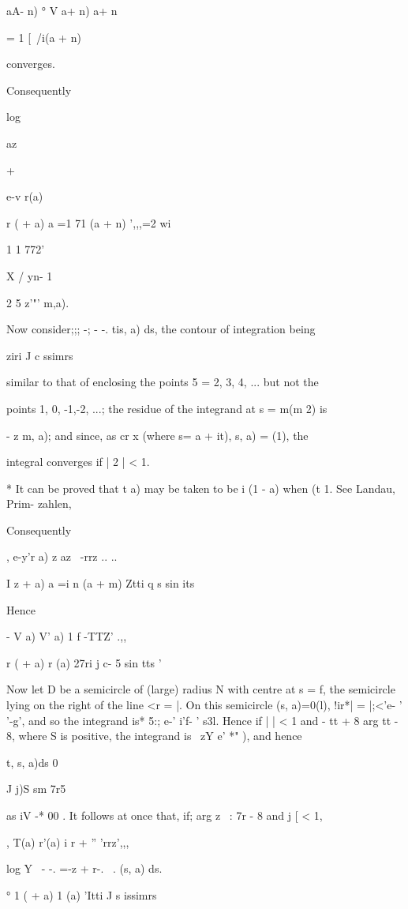 {{ aA- n) ° V a+ n) a+ n

= 1 [\ /i(a + n)

converges.

Consequently

log

az

+

e-v r(a)

r ( + a) a =1 71 (a + n) ',,,=2 wi

1 1 772'

X / yn- 1

2 5 z'"' m,a).

Now consider;;; -; - -. tis, a) ds, the contour of integration being

ziri J c ssimrs

similar to that of enclosing the points 5 = 2, 3, 4, ... but
not the

points 1, 0, -1,-2, ...; the residue of the integrand at s = m(m 2) is

- z m, a); and since, as cr x (where s= a + it), s, a) = (1), the

integral converges if | 2 | < 1.

* It can be proved that t a) may be taken to be i (1 - a) when (t 1.
See Landau, Prim- zahlen, %

%
%

Consequently

, e-y'r a) z az \ -rrz .. ..

I z + a) a =i n (a + m) Ztti q s sin its

Hence

- V a) V' a) 1 f -TTZ' .,,

  r ( + a) r (a) 27ri j c- 5 sin tts '

Now let D be a semicircle of (large) radius N with centre at s = f,
the semicircle lying on the right of the line <r = |. On this
semicircle (s, a)=0(l), !ir*| = |;<'e- ' '-g', and so the integrand
is* 5:; e-' i'f- ' s3l. Hence if | | < 1 and - tt + 8 arg tt - 8,
where S is positive, the integrand is \ zY e' *" ), and hence

t, s, a)ds 0

J j)S sm 7r5

as iV -* 00 . It follows at once that, if; arg z \ : 7r - 8 and j [ <
1,

, T(a) r'(a) i r + '' 'rrz',,,

log Y ~- -. =-z + r-. ~. (s, a) ds.

° 1 ( + a) 1 (a) 'Itti J s issimrs

}}
